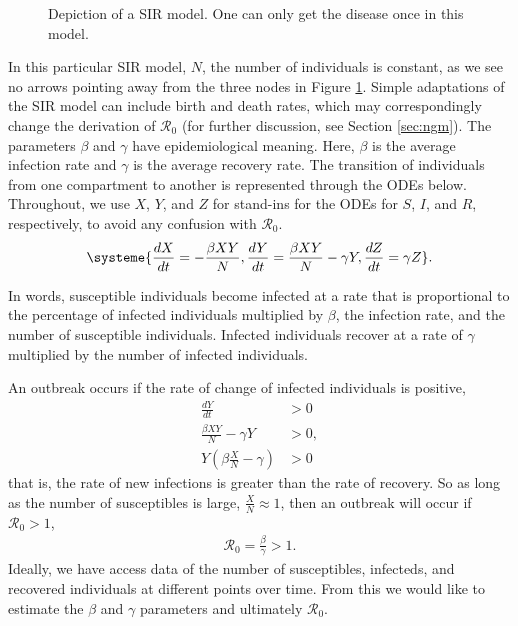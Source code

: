\documentclass[12pt]{article}
\newcommand{\rr}{\ensuremath{\mathcal{R}_0}}
\begin{document}
\begin{figure}[h]
\centering
{}
\caption{Depiction of a SIR model.  One can only get the disease once in this model.}\label{fig::sir}
\end{figure}
In this particular  SIR model, $N$, the number of individuals is constant, as we see no arrows pointing away from the three nodes in Figure \ref{fig::sir}. Simple adaptations of the SIR model can include birth and death rates, which may correspondingly change the derivation of $\rr$ (for further discussion, see Section \ref{sec:ngm}). The parameters  $\beta$ and $\gamma$ have epidemiological meaning.  Here, $\beta$ is the average infection rate and $\gamma$ is the average recovery rate.  The transition of individuals from one compartment to another is represented through the ODEs below.  Throughout, we use $X$, $Y$, and $Z$ for stand-ins for the ODEs for $S$, $I$, and $R$, respectively, to avoid any confusion with $\rr$.
\begin{align}
\systeme{\frac{dX}{dt} = -\frac{\beta XY}{N}, \frac{dY}{dt} = \frac{\beta XY}{N} - \gamma Y, \frac{dZ}{dt} = \gamma Z}. \label{eq::sir}
\end{align}

In words, susceptible individuals become infected at a rate that is proportional to the percentage of infected individuals multiplied by $\beta$, the infection rate, and the number of susceptible individuals.  Infected individuals recover at a rate of $\gamma$ multiplied by the number of infected individuals.

An outbreak occurs if the rate of change of infected individuals is positive,
\begin{align*}
  \frac{dY}{dt} &> 0 \\
  \frac{\beta X Y}{N}  - \gamma Y &> 0 ,\\
  Y \left ( \beta \frac{X}{N} - \gamma \right ) & > 0
\end{align*}
that is,  the rate of new infections is greater than the rate of recovery.  So as long as the number of susceptibles is large, $\frac{X}{N} \approx 1$, then an outbreak will occur if $\rr >1$,
\begin{align}\label{eq:deriv_sir}
  \rr = \frac{\beta}{\gamma} > 1.
  \end{align}
Ideally, we have access data of the number of susceptibles, infecteds, and recovered individuals at different points over time.  From this we would like to estimate the $\beta$ and $\gamma$ parameters and ultimately $\rr$.
\end{document}
